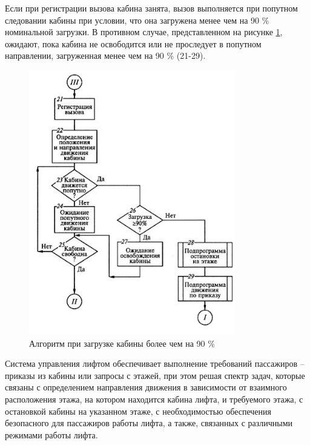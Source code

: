     Если при регистрации вызова кабина занята, вызов выполняется при попутном следовании кабины при условии, что она загружена            менее чем на 90 \% номинальной загрузки. В противном случае, представленном на рисунке \ref{dk5}, ожидают, пока кабина не          освободится или не проследует в попутном направлении, загруженная менее чем на 90 \% (21-29).
    
    \begin{figure}[h]
				\centering
				\includegraphics[width=90mm]{src/pictures/image5.jpg}
				\caption{Алгоритм при загрузке кабины более чем на 90 \%}\label{dk5}
    \end{figure}

	Система управления лифтом обеспечивает выполнение требований пассажиров
		-- приказы из кабины или запросы с этажей, при этом решая спектр задач,
		которые связаны с определением направления движения в зависимости от взаимного расположения этажа,
		на котором находится кабина лифта, и требуемого этажа, с остановкой кабины на указанном этаже,
		с необходимостью обеспечения безопасного для пассажиров работы лифта,
		а также, связанных с различными режимами работы лифта.

